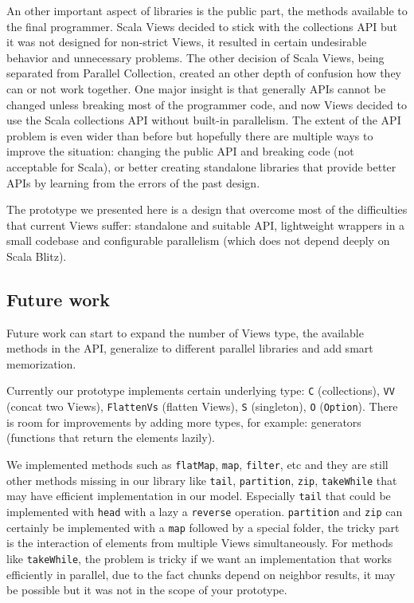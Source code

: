 \documentclass[a4paper,12pt,twocolumn]{article}
\begin{document}
An other important aspect of libraries is the public part, the methods available to the final programmer.
Scala Views decided to stick with the collections API but it was not designed for non-strict Views, it resulted in certain undesirable behavior and unnecessary problems.
The other decision of Scala Views, being separated from Parallel Collection, created an other depth of confusion how they can or not work together.
One major insight is that generally APIs cannot be changed unless breaking most of the programmer code, and now Views decided to use the Scala collections API without built-in parallelism.
The extent of the API problem is even wider than before but hopefully there are multiple ways to improve the situation: changing the public API and breaking code (not acceptable for Scala), or better creating standalone libraries that provide better APIs by learning from the errors of the past design.

The prototype we presented here is a design that overcome most of the difficulties that current Views suffer: standalone and suitable API, lightweight wrappers in a small codebase and configurable parallelism (which does not depend deeply on Scala Blitz).

\subsection{Future work}
Future work can start to expand the number of Views type, the available methods in the API, generalize to different parallel libraries and add smart memorization.

Currently our prototype implements certain underlying type: \verb|C| (collections), \verb|VV| (concat two Views), \verb|FlattenVs| (flatten Views), \verb|S| (singleton), \verb|O| (\verb|Option|).
There is room for improvements by adding more types, for example: generators (functions that return the elements lazily).

We implemented methods such as \verb|flatMap|, \verb|map|, \verb|filter|, etc and they are still other methods missing in our library like \verb|tail|, \verb|partition|, \verb|zip|, \verb|takeWhile| that may have efficient implementation in our model.
Especially \verb|tail| that could be implemented with \verb|head| with a lazy a \verb|reverse| operation.
\verb|partition| and \verb|zip| can certainly be implemented with a \verb|map| followed by a special folder, the tricky part is the interaction of elements from multiple Views simultaneously.
For methods like \verb|takeWhile|, the problem is tricky if we want an implementation that works efficiently in parallel, due to the fact chunks depend on neighbor results, it may be possible but it was not in the scope of your prototype.
\end{document}
